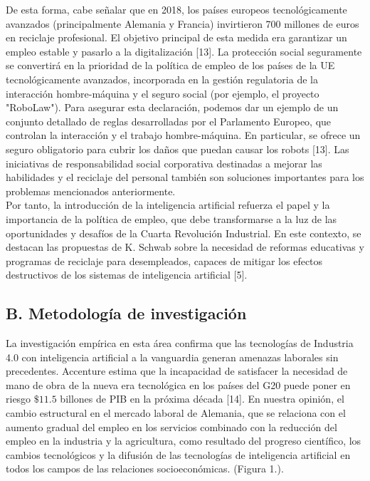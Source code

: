 De esta forma, cabe señalar que en 2018, los países europeos tecnológicamente avanzados (principalmente Alemania y Francia) invirtieron 700 millones de euros en reciclaje profesional. El objetivo principal de esta medida era garantizar un empleo estable y pasarlo a la digitalización [13]. La protección social seguramente se convertirá en la prioridad de la política de empleo de los países de la UE tecnológicamente avanzados, incorporada en la gestión regulatoria de la interacción hombre-máquina y el seguro social (por ejemplo, el proyecto "RoboLaw"). Para asegurar esta declaración, podemos dar un ejemplo de un conjunto detallado de reglas desarrolladas por el Parlamento Europeo, que controlan la interacción y el trabajo hombre-máquina. En particular, se ofrece un seguro obligatorio para cubrir los daños que puedan causar los robots [13]. Las iniciativas de responsabilidad social corporativa destinadas a mejorar las habilidades y el reciclaje del personal también son soluciones importantes para los problemas mencionados anteriormente.\\

Por tanto, la introducción de la inteligencia artificial refuerza el papel y la importancia de la política de empleo, que debe transformarse a la luz de las oportunidades y desafíos de la Cuarta Revolución Industrial. En este contexto, se destacan las propuestas de K. Schwab sobre la necesidad de reformas educativas y programas de reciclaje para desempleados, capaces de mitigar los efectos destructivos de los sistemas de inteligencia artificial [5].\\

\subsection*{B. Metodología de investigación}
La investigación empírica en esta área confirma que las tecnologías de Industria 4.0 con inteligencia artificial a la vanguardia generan amenazas laborales sin precedentes. Accenture estima que la incapacidad de satisfacer la necesidad de mano de obra de la nueva era tecnológica en los países del G20 puede poner en riesgo $\$ 11.5$ billones de PIB en la próxima década [14]. En nuestra opinión, el cambio estructural en el mercado laboral de Alemania, que se relaciona con el aumento gradual del empleo en los servicios combinado con la reducción del empleo en la industria y la agricultura, como resultado del progreso científico, los cambios tecnológicos y la difusión de las tecnologías de inteligencia artificial en todos los campos de las relaciones socioeconómicas. (Figura 1.).\\

